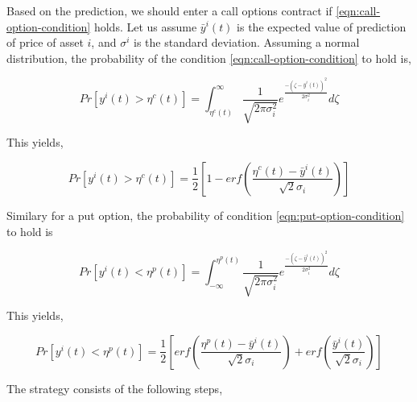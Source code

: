 \documentclass{article}
\begin{document}
Based on the prediction, we should enter a call options contract if
\ref{eqn:call-option-condition} holds. Let us assume $\bar{y}^{i}(t)$
is the expected value of prediction of price of asset $i$, and
$\sigma^{i}$ is the standard deviation. Assuming a normal
distribution, the probability of the condition
\ref{eqn:call-option-condition} to hold is,

\begin{equation}\label{eqn:call-option-prob-intg}
Pr[ y^{i}(t) > \eta^{c}(t) ] = \int_{\eta^{c}(t)}^{\infty}
\frac{1}{\sqrt{2\pi\sigma_{i}^{2}}}
e^{\frac{-(\zeta-\bar{y}^{i}(t))^{2}}{2\sigma_{i}^{2}}} d\zeta
\end{equation}

This yields,

\begin{equation}\label{eqn:call-option-prob}
Pr[ y^{i}(t) > \eta^{c}(t) ] = \frac{1}{2} [ 1 - erf(
  \frac{\eta^{c}(t)-\bar{y}^{i}(t)}{\sqrt{2} \sigma_{i}} ) ]
\end{equation}

Similary for a put option, the probability of
condition \ref{eqn:put-option-condition} to hold is

\begin{equation}\label{eqn:put-option-prob-intg}
Pr[ y^{i}(t) < \eta^{p}(t) ] =
\int_{-\infty}^{\eta^{p}(t)} \frac{1}{\sqrt{2\pi\sigma_{i}^{2}}}
e^{\frac{-(\zeta-\bar{y}^{i}(t))^{2}}{2\sigma_{i}^{2}}} d\zeta
\end{equation}

This yields,

\begin{equation}\label{eqn:put-option-prob}
Pr[ y^{i}(t) < \eta^{p}(t) ] = \frac{1}{2} [ erf(
  \frac{\eta^{p}(t)-\bar{y}^{i}(t)}{\sqrt{2} \sigma_{i}} ) +
  erf( \frac{\bar{y}^{i}(t)}{\sqrt{2} \sigma_{i}} ) ]
\end{equation}

The strategy consists of the following steps,
\end{document}
